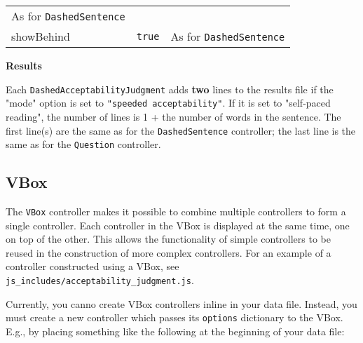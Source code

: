 \documentclass[
]{article}
\begin{document}
\begin{RaggedRight}
\begin{longtable}[]{p{1.7in}p{1in}p{3.15in}}
\begin{minipage}[t]{0.49\columnwidth}
As for \texttt{DashedSentence}\strut
\end{minipage}\tabularnewline
\begin{minipage}[t]{0.17\columnwidth}\raggedright
showBehind\strut
\end{minipage} & \begin{minipage}[t]{0.25\columnwidth}\raggedright
\texttt{true}\strut
\end{minipage} & \begin{minipage}[t]{0.49\columnwidth}\raggedright
As for \texttt{DashedSentence}\strut
\end{minipage}\tabularnewline
\bottomrule
\end{longtable}\normalsize\end{RaggedRight}

\textbf{Results}

Each \texttt{DashedAcceptabilityJudgment} adds \textbf{two} lines to the
results file if the "mode" option is set to
\texttt{"speeded\ acceptability"}. If it is set to "self-paced reading",
the number of lines is 1 + the number of words in the sentence. The
first line(s) are the same as for the \texttt{DashedSentence}
controller; the last line is the same as for the \texttt{Question}
controller.

\hypertarget{vbox}{%
\subsection{VBox}\label{vbox}}

The \texttt{VBox} controller makes it possible to combine multiple
controllers to form a single controller. Each controller in the VBox is
displayed at the same time, one on top of the other. This allows the
functionality of simple controllers to be reused in the construction of
more complex controllers. For an example of a controller constructed
using a VBox, see \texttt{js\_includes/acceptability\_judgment.js}.

Currently, you canno create VBox controllers inline in your data file.
Instead, you must create a new controller which passes its
\texttt{options} dictionary to the VBox. E.g., by placing something like
the following at the beginning of your data file:
\end{document}
